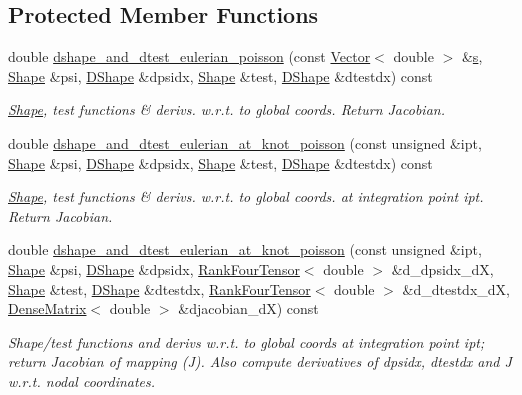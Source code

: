 \subsection*{Protected Member Functions}
\begin{DoxyCompactItemize}
\item 
double \hyperlink{classoomph_1_1QPoissonElement_aa3ae03aec64e427b10b791acaf36ae74}{dshape\+\_\+and\+\_\+dtest\+\_\+eulerian\+\_\+poisson} (const \hyperlink{classoomph_1_1Vector}{Vector}$<$ double $>$ \&\hyperlink{cfortran_8h_ab7123126e4885ef647dd9c6e3807a21c}{s}, \hyperlink{classoomph_1_1Shape}{Shape} \&psi, \hyperlink{classoomph_1_1DShape}{D\+Shape} \&dpsidx, \hyperlink{classoomph_1_1Shape}{Shape} \&test, \hyperlink{classoomph_1_1DShape}{D\+Shape} \&dtestdx) const
\begin{DoxyCompactList}\small\item\em \hyperlink{classoomph_1_1Shape}{Shape}, test functions \& derivs. w.\+r.\+t. to global coords. Return Jacobian. \end{DoxyCompactList}\item 
double \hyperlink{classoomph_1_1QPoissonElement_a0f51d1468383a7af95b82522038d4e20}{dshape\+\_\+and\+\_\+dtest\+\_\+eulerian\+\_\+at\+\_\+knot\+\_\+poisson} (const unsigned \&ipt, \hyperlink{classoomph_1_1Shape}{Shape} \&psi, \hyperlink{classoomph_1_1DShape}{D\+Shape} \&dpsidx, \hyperlink{classoomph_1_1Shape}{Shape} \&test, \hyperlink{classoomph_1_1DShape}{D\+Shape} \&dtestdx) const
\begin{DoxyCompactList}\small\item\em \hyperlink{classoomph_1_1Shape}{Shape}, test functions \& derivs. w.\+r.\+t. to global coords. at integration point ipt. Return Jacobian. \end{DoxyCompactList}\item 
double \hyperlink{classoomph_1_1QPoissonElement_a0e919ee36672fdf05dedad29d8e53b8a}{dshape\+\_\+and\+\_\+dtest\+\_\+eulerian\+\_\+at\+\_\+knot\+\_\+poisson} (const unsigned \&ipt, \hyperlink{classoomph_1_1Shape}{Shape} \&psi, \hyperlink{classoomph_1_1DShape}{D\+Shape} \&dpsidx, \hyperlink{classoomph_1_1RankFourTensor}{Rank\+Four\+Tensor}$<$ double $>$ \&d\+\_\+dpsidx\+\_\+dX, \hyperlink{classoomph_1_1Shape}{Shape} \&test, \hyperlink{classoomph_1_1DShape}{D\+Shape} \&dtestdx, \hyperlink{classoomph_1_1RankFourTensor}{Rank\+Four\+Tensor}$<$ double $>$ \&d\+\_\+dtestdx\+\_\+dX, \hyperlink{classoomph_1_1DenseMatrix}{Dense\+Matrix}$<$ double $>$ \&djacobian\+\_\+dX) const
\begin{DoxyCompactList}\small\item\em Shape/test functions and derivs w.\+r.\+t. to global coords at integration point ipt; return Jacobian of mapping (J). Also compute derivatives of dpsidx, dtestdx and J w.\+r.\+t. nodal coordinates. \end{DoxyCompactList}\end{DoxyCompactItemize}
